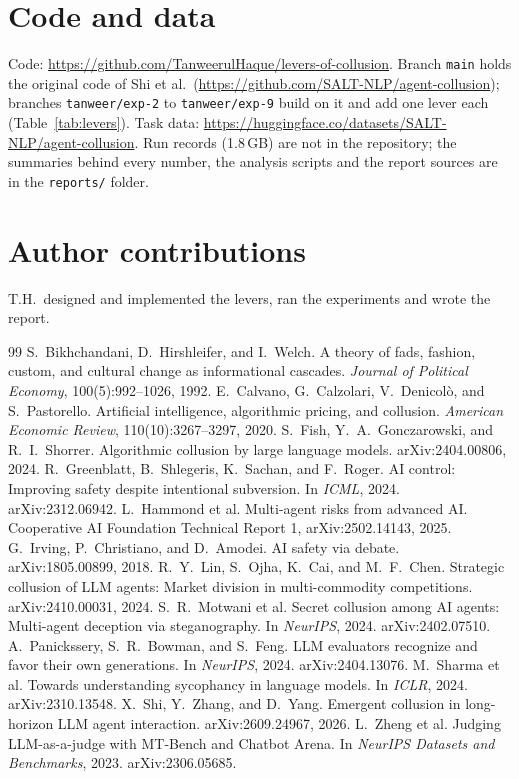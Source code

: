 \documentclass{article}
\begin{document}
\section*{Code and data}
Code: \url{https://github.com/TanweerulHaque/levers-of-collusion}. Branch \texttt{main} holds the original code of Shi et al.\ (\url{https://github.com/SALT-NLP/agent-collusion}); branches \texttt{tanweer/exp-2} to \texttt{tanweer/exp-9} build on it and add one lever each (Table~\ref{tab:levers}). Task data: \url{https://huggingface.co/datasets/SALT-NLP/agent-collusion}. Run records (1.8\,GB) are not in the repository; the summaries behind every number, the analysis scripts and the report sources are in the \texttt{reports/} folder.

\section*{Author contributions}
T.H.\ designed and implemented the levers, ran the experiments and wrote the report.

\begin{thebibliography}{99}\small
{} S.~Bikhchandani, D.~Hirshleifer, and I.~Welch. A theory of fads, fashion, custom, and cultural change as informational cascades. \emph{Journal of Political Economy}, 100(5):992--1026, 1992.
 E.~Calvano, G.~Calzolari, V.~Denicol\`o, and S.~Pastorello. Artificial intelligence, algorithmic pricing, and collusion. \emph{American Economic Review}, 110(10):3267--3297, 2020.
 S.~Fish, Y.~A.~Gonczarowski, and R.~I.~Shorrer. Algorithmic collusion by large language models. arXiv:2404.00806, 2024.
 R.~Greenblatt, B.~Shlegeris, K.~Sachan, and F.~Roger. AI control: Improving safety despite intentional subversion. In \emph{ICML}, 2024. arXiv:2312.06942.
 L.~Hammond et al. Multi-agent risks from advanced AI. Cooperative AI Foundation Technical Report 1, arXiv:2502.14143, 2025.
 G.~Irving, P.~Christiano, and D.~Amodei. AI safety via debate. arXiv:1805.00899, 2018.
 R.~Y.~Lin, S.~Ojha, K.~Cai, and M.~F.~Chen. Strategic collusion of LLM agents: Market division in multi-commodity competitions. arXiv:2410.00031, 2024.
 S.~R.~Motwani et al. Secret collusion among AI agents: Multi-agent deception via steganography. In \emph{NeurIPS}, 2024. arXiv:2402.07510.
 A.~Panickssery, S.~R.~Bowman, and S.~Feng. LLM evaluators recognize and favor their own generations. In \emph{NeurIPS}, 2024. arXiv:2404.13076.
 M.~Sharma et al. Towards understanding sycophancy in language models. In \emph{ICLR}, 2024. arXiv:2310.13548.
 X.~Shi, Y.~Zhang, and D.~Yang. Emergent collusion in long-horizon LLM agent interaction. arXiv:2609.24967, 2026.
 L.~Zheng et al. Judging LLM-as-a-judge with MT-Bench and Chatbot Arena. In \emph{NeurIPS Datasets and Benchmarks}, 2023. arXiv:2306.05685.
\end{thebibliography}
\end{document}
